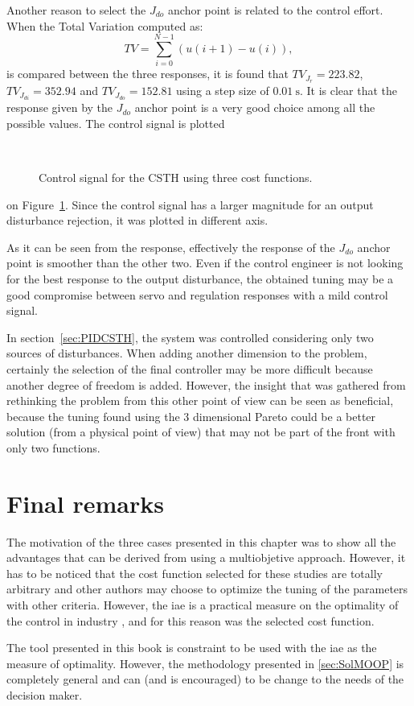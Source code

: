 Another reason to select the $J_{do}$ anchor point is related to the control effort. When the Total Variation computed as:
\begin{equation*}
TV = \sum_{i=0}^{N-1}\left(  u(i+1)-u(i)\right),
\end{equation*}
is compared between the three responses, it is found that $TV_{J_r} = 223.82$, $TV_{J_{di}} = 352.94$ and $TV_{J_{do}} = 152.81$ using a step size of $\SI{0.01}{\second}$. It is clear that the response given by the $J_{do}$ anchor point is a very good choice among all the possible values. The control signal is plotted %
%
\begin{figure}[tb]
	\centering
	\\
	\caption{Control signal for the CSTH using three cost functions.}
	\label{fig:Ch7CSTHControlledCV3Fun}
\end{figure}
%
on Figure~\ref{fig:Ch7CSTHControlledCV3Fun}. Since the control signal has a larger magnitude for an output disturbance rejection, it was plotted in different axis.

As it can be seen from the response, effectively the response of the $J_{do}$ anchor point is smoother than the other two. Even if the control engineer is not looking for the best response to the output disturbance, the obtained tuning may be a good compromise between servo and regulation responses with a mild control signal.

In section~\ref{sec:PIDCSTH}, the system was controlled considering only two sources of disturbances. When adding another dimension to the problem, certainly the selection of the final controller may be more difficult because another degree of freedom is added. However, the insight that was gathered from rethinking the problem from this other point of view can be seen as beneficial, because the tuning found using the 3 dimensional Pareto could be a better solution (from a physical point of view) that may not be part of the front with only two functions.
%
\section{Final remarks}
\label{sec:FinalRemarks}
The motivation of the three cases presented in this chapter was to show all the advantages that can be derived from using a multiobjetive approach. However, it has to be noticed that the cost function selected for these studies are totally  arbitrary and other authors may choose to optimize the tuning of the parameters with other criteria. However, the \gls{iae} is a practical measure on the optimality of the control in industry \citep{Shinskey2002}, and for this reason was the selected cost function.

The tool presented in this book is constraint to be used with the \gls{iae} as the measure of optimality. However, the methodology presented in \ref{sec:SolMOOP} is completely general and can (and is encouraged) to be change to the needs of the decision maker.
